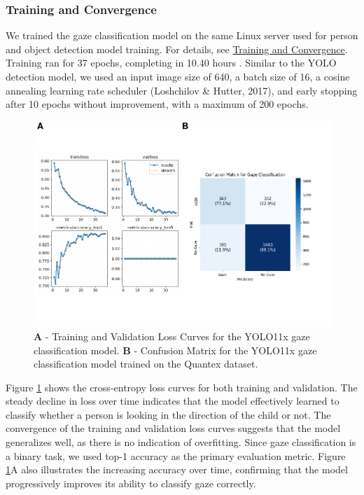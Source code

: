 \documentclass[
  man,floatsintext]{apa6}
\begin{document}
\subsubsection{Training and Convergence}\label{training-and-convergence}

We trained the gaze classification model on the same Linux server used for person and object detection model training. For details, see \hyperref[training-face]{Training and Convergence}. Training ran for 37 epochs, completing in 10.40 hours . Similar to the YOLO detection model, we used an input image size of 640, a batch size of 16, a cosine annealing learning rate scheduler (Loshchilov \& Hutter, 2017), and early stopping after 10 epochs without improvement, with a maximum of 200 epochs.

\begin{figure}

{\centering \includegraphics{Quantex_interaction_paper_files/figure-latex/gaze-loss-confusion-matrix-1} 

}

\caption{\textbf{A} - Training and Validation Loss Curves for the YOLO11x gaze classification model. \textbf{B} - Confusion Matrix for the YOLO11x gaze classification model trained on the Quantex dataset.}\label{fig:gaze-loss-confusion-matrix}
\end{figure}

Figure \ref{fig:gaze-loss-confusion-matrix} shows the cross-entropy loss curves for both training and validation. The steady decline in loss over time indicates that the model effectively learned to classify whether a person is looking in the direction of the child or not. The convergence of the training and validation loss curves suggests that the model generalizes well, as there is no indication of overfitting. Since gaze classification is a binary task, we used top-1 accuracy as the primary evaluation metric. Figure \ref{fig:gaze-loss-confusion-matrix}A also illustrates the increasing accuracy over time, confirming that the model progressively improves its ability to classify gaze correctly.
\end{document}
